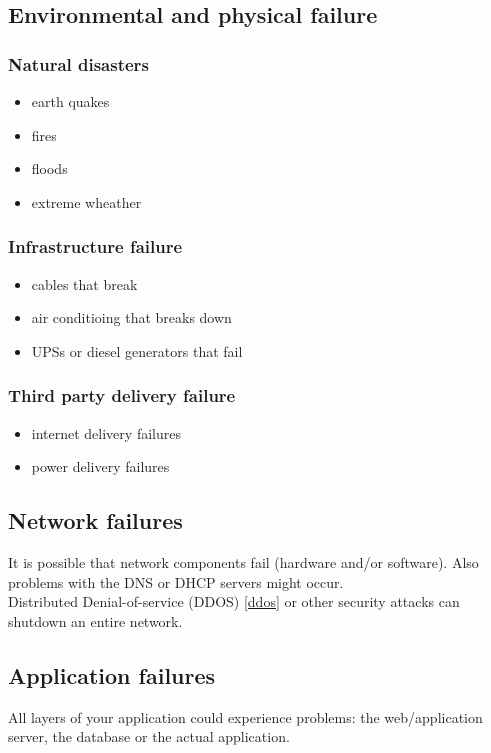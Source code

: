 \documentclass[12pt]{report}
\begin{document}
\subsection{Environmental and physical failure}
\subsubsection{Natural disasters}
\begin{itemize}
\item earth quakes
\item fires
\item floods
\item extreme wheather
\end{itemize}
\subsubsection{Infrastructure failure}
\begin{itemize}
\item cables that break
\item air conditioing that breaks down
\item UPSs or diesel generators that fail
\end{itemize}
\subsubsection{Third party delivery failure}
\begin{itemize}
\item internet delivery failures
\item power delivery failures
\end{itemize}

\subsection{Network failures}
It is possible that network components fail (hardware and/or
software). Also problems with the DNS or DHCP servers might occur.\\
Distributed Denial-of-service (DDOS) \ref{ddos} or other security 
 attacks can shutdown an entire network.

\subsection{Application failures}
All layers of your application could experience problems: the web/application
server, the database or the actual application.
\end{document}
